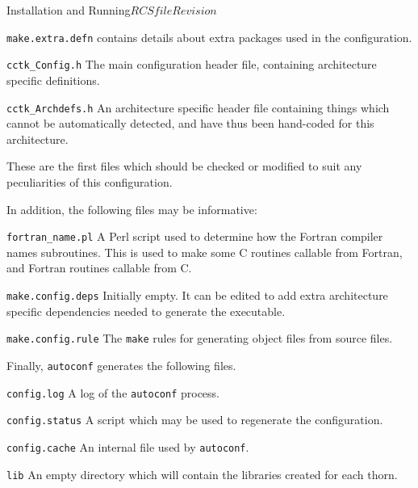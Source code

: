 \begin{cactuspart}{Installation and Running}{$RCSfile$}{$Revision$}
\begin{Lentry}
\begin{Lentry}
\item [\texttt{make.extra.defn}]
contains details about extra packages used in the configuration.

\item [\texttt{cctk\_Config.h}]
The main configuration header file, containing architecture specific
definitions.

\item [\texttt{cctk\_Archdefs.h}]
An architecture specific header file containing things which cannot be
automatically detected, and have thus been hand-coded for this architecture.
\end{Lentry}

These are the first files which should be checked or modified to suit any
peculiarities of this configuration.

In addition, the following files may be informative:

\begin{Lentry}
\item [\texttt{fortran\_name.pl}]
A Perl script used to determine how the Fortran compiler names subroutines.
This is used to make some C routines callable from Fortran, and Fortran
routines callable from C.

\item [\texttt{make.config.deps}]
Initially empty.  It can be edited to add extra architecture specific dependencies
needed to generate the executable.

\item [\texttt{make.config.rule}]
The \texttt{make} rules for generating object files from source files.

\end{Lentry}

Finally, \texttt{autoconf} generates the following files.

\begin{Lentry}

\item [\texttt{config.log}]
A log of the \texttt{autoconf} process.

\item [\texttt{config.status}]
A script which may be used to regenerate the configuration.

\item [\texttt{config.cache}]
An internal file used by \texttt{autoconf}.

\end{Lentry}

\item [\texttt{lib}]
An empty directory which will contain the libraries created for each thorn.


\end{Lentry}
\end{cactuspart}
